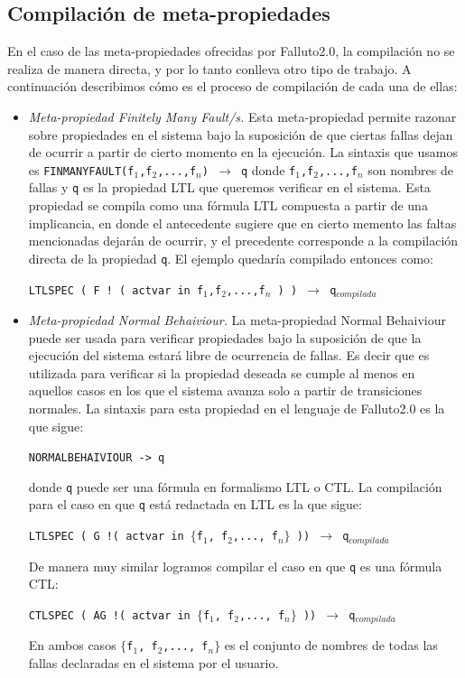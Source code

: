\documentclass[titlepage, 12pt]{book}
\begin{document}
\subsection*{Compilaci\'on de meta-propiedades}
En el caso de las meta-propiedades ofrecidas por Falluto2.0, la compilaci\'on no se realiza de manera directa, y por lo tanto conlleva otro tipo de trabajo. A continuaci\'on describimos c\'omo es el proceso de compilaci\'on de cada una de ellas:
\begin{itemize}
\item \textit{Meta-propiedad Finitely Many Fault/s.} Esta meta-propiedad permite razonar sobre propiedades en el sistema bajo la suposici\'on de que ciertas fallas dejan de ocurrir a partir de cierto momento en la ejecuci\'on. La sintaxis que usamos es \texttt{FINMANYFAULT(f$_1$,f$_2$,...,f$_n$) $\rightarrow$ q} donde \texttt{f$_1$,f$_2$,...,f$_n$} son nombres de fallas y \texttt{q} es la propiedad LTL que queremos verificar en el sistema. Esta propiedad se compila como una f\'ormula LTL compuesta a partir de una implicancia, en donde el antecedente sugiere que en cierto memento las faltas mencionadas dejar\'an de ocurrir, y el precedente corresponde a la compilaci\'on directa de la propiedad \texttt{q}. El ejemplo quedar\'ia compilado entonces como:
\begin{center}
\texttt{LTLSPEC~(~F~!~(~actvar~in~{f$_1$,f$_2$,...,f$_n$}~)~)~$\rightarrow$~q$_{compilada}$}
\end{center}
\item \textit{Meta-propiedad Normal Behaiviour.} La meta-propiedad Normal Behaiviour puede ser usada para verificar propiedades bajo la suposici\'on de que la ejecuci\'on del sistema estar\'a libre de ocurrencia de fallas. Es decir que es utilizada para verificar si la propiedad deseada se cumple al menos en aquellos casos en los que el sistema avanza solo a partir de transiciones normales. La sintaxis para esta propiedad en el lenguaje de Falluto2.0 es la que sigue: \begin{center}\texttt{NORMALBEHAIVIOUR -> q}\end{center} donde \texttt{q} puede ser una f\'ormula en formalismo LTL o CTL. La compilaci\'on para el caso en que \texttt{q} est\'a redactada en LTL es la que sigue:
\begin{center}
\texttt{LTLSPEC~(~G~!(~actvar~in~$\lbrace$f$_1$, f$_2$,..., f$_n \rbrace$~))~$\rightarrow$~q$_{compilada}$}
\end{center}
De manera muy similar logramos compilar el caso en que \texttt{q} es una f\'ormula CTL:
\begin{center}
\texttt{CTLSPEC~(~AG~!(~actvar~in~$\lbrace$f$_1$, f$_2$,..., f$_n \rbrace$~))~$\rightarrow$~q$_{compilada}$}
\end{center}
En ambos casos \texttt{$\lbrace$f$_1$, f$_2$,..., f$_n \rbrace$} es el conjunto de nombres de todas las fallas declaradas en el sistema por el usuario.
\end{itemize}
\end{document}
